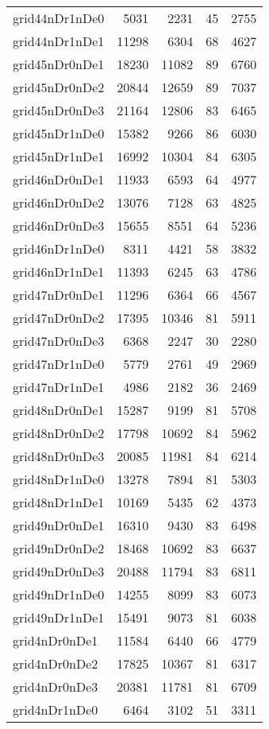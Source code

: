 \begin{longtable}{lrrrr}
grid44nDr1nDe0 & 5031 & 2231 & 45 & 2755 \\
grid44nDr1nDe1 & 11298 & 6304 & 68 & 4627 \\
grid45nDr0nDe1 & 18230 & 11082 & 89 & 6760 \\
grid45nDr0nDe2 & 20844 & 12659 & 89 & 7037 \\
grid45nDr0nDe3 & 21164 & 12806 & 83 & 6465 \\
grid45nDr1nDe0 & 15382 & 9266 & 86 & 6030 \\
grid45nDr1nDe1 & 16992 & 10304 & 84 & 6305 \\
grid46nDr0nDe1 & 11933 & 6593 & 64 & 4977 \\
grid46nDr0nDe2 & 13076 & 7128 & 63 & 4825 \\
grid46nDr0nDe3 & 15655 & 8551 & 64 & 5236 \\
grid46nDr1nDe0 & 8311 & 4421 & 58 & 3832 \\
grid46nDr1nDe1 & 11393 & 6245 & 63 & 4786 \\
grid47nDr0nDe1 & 11296 & 6364 & 66 & 4567 \\
grid47nDr0nDe2 & 17395 & 10346 & 81 & 5911 \\
grid47nDr0nDe3 & 6368 & 2247 & 30 & 2280 \\
grid47nDr1nDe0 & 5779 & 2761 & 49 & 2969 \\
grid47nDr1nDe1 & 4986 & 2182 & 36 & 2469 \\
grid48nDr0nDe1 & 15287 & 9199 & 81 & 5708 \\
grid48nDr0nDe2 & 17798 & 10692 & 84 & 5962 \\
grid48nDr0nDe3 & 20085 & 11981 & 84 & 6214 \\
grid48nDr1nDe0 & 13278 & 7894 & 81 & 5303 \\
grid48nDr1nDe1 & 10169 & 5435 & 62 & 4373 \\
grid49nDr0nDe1 & 16310 & 9430 & 83 & 6498 \\
grid49nDr0nDe2 & 18468 & 10692 & 83 & 6637 \\
grid49nDr0nDe3 & 20488 & 11794 & 83 & 6811 \\
grid49nDr1nDe0 & 14255 & 8099 & 83 & 6073 \\
grid49nDr1nDe1 & 15491 & 9073 & 81 & 6038 \\
grid4nDr0nDe1 & 11584 & 6440 & 66 & 4779 \\
grid4nDr0nDe2 & 17825 & 10367 & 81 & 6317 \\
grid4nDr0nDe3 & 20381 & 11781 & 81 & 6709 \\
grid4nDr1nDe0 & 6464 & 3102 & 51 & 3311 \\

\end{longtable}
